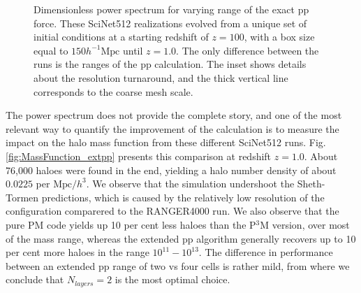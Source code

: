 \begin{figure}
  \begin{center}
  \caption{ Dimensionless power spectrum for varying range of the exact pp force.
  These SciNet512 realizations evolved from a unique set of initial conditions at a starting redshift of $z = 100$, with a box size equal to $ 150 h^{-1}\mbox{Mpc}$ 
  until $z=1.0$. The only difference between the runs is the ranges of the pp calculation. The inset shows details about the resolution turnaround, and the
  thick vertical line corresponds to the coarse mesh scale. }
    \label{fig:power}
  \end{center}
\end{figure}



The power spectrum does not provide the complete story, and one of the most relevant way to quantify the improvement of the calculation is to measure the impact on the halo mass function from these different SciNet512 runs. Fig. \ref{fig:MassFunction_extpp} presents this comparison at redshift $z = 1.0$. About 76,000 haloes were found in the end, yielding a halo number density of about $0.0225$ per $\mbox{Mpc/$h$}^{3}$. 
We observe that the simulation undershoot the Sheth-Tormen predictions, which is caused by the relatively low resolution of the configuration
comparered to the RANGER4000 run. 
We also observe that the pure PM code yields up 10 per cent less haloes than the P$^{3}$M version, over most of the mass range,
whereas the extended pp algorithm generally recovers  up to 10 per cent more haloes in the range $10^{11} - 10^{13}$.
The difference in performance between an extended pp  range of two vs four cells is rather mild, from where
we conclude that $N_{layers} = 2$ is the most optimal choice.


